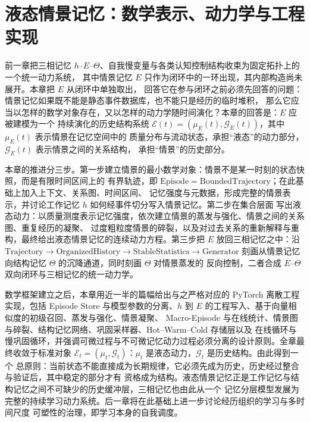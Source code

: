 \chapter{液态情景记忆：数学表示、动力学与工程实现}

\begin{chapterlead}
前一章把三相记忆 $h$--$E$--$\Theta$、自我慢变量与各类认知控制结构收束为固定拓扑上的一个统一动力系统，
其中情景记忆 $E$ 只作为闭环中的一环出现，其内部构造尚未展开。本章把 $E$ 从闭环中单独取出，
回答它在参与闭环之前必须先回答的问题：情景记忆如果既不能是静态事件数据库，也不能只是经历的临时堆积，
那么它应当以怎样的数学对象存在，又以怎样的动力学随时间演化？本章的回答是：$E$ 应被建模为一个
持续演化的历史结构系统 $\mathcal{E}(t)=(\mu_E(t),\mathcal{G}_E(t))$，其中 $\mu_E(t)$ 表示情景在记忆空间中的
质量分布与流动状态，承担“液态”的动力部分，$\mathcal{G}_E(t)$ 表示情景之间的关系结构，
承担“情景”的历史部分。

本章的推进分三步。第一步建立情景的最小数学对象：情景不是某一时刻的状态快照，而是有限时间区间上的
有界轨迹，即 $\mathrm{Episode}=\mathrm{BoundedTrajectory}$；在此基础上加入上下文、关系图、时间区间、
记忆强度与元数据，形成完整的情景表示，并讨论工作记忆 $h$ 如何经事件切分写入情景记忆。第二步在集合层面
写出液态动力：以质量测度表示记忆强度，依次建立情景的蒸发与强化、情景之间的关系图、重复经历的凝聚、
过度粗粒度情景的碎裂，以及对过去关系的重新解释与重构，最终给出液态情景记忆的连续动力方程。第三步把
$E$ 放回三相记忆之中：沿 $\mathrm{Trajectory}\to\mathrm{OrganizedHistory}\to\mathrm{StableStatistics}
\to\mathrm{Generator}$ 刻画从情景记忆向结构记忆 $\Theta$ 的沉降通道，同时刻画 $\Theta$ 对情景蒸发的
反向控制，二者合成 $E$--$\Theta$ 双向闭环与三相记忆的统一动力学。

数学框架建立之后，本章用近一半的篇幅给出与之严格对应的 PyTorch 离散工程实现，包括 Episode Store
与模型参数的分离、$h$ 到 $E$ 的工程写入、基于向量相似度的初级召回、蒸发与强化、情景凝聚、
Macro-Episode 与在线统计、情景图与碎裂、结构记忆网络、巩固采样器、Hot--Warm--Cold 存储层以及
在线循环与慢巩固循环，并强调可微过程与不可微记忆动力过程必须分离的设计原则。全章最终收敛于标准对象
$\mathcal{E}_t=(\mu_t,\mathcal{G}_t)$：$\mu_t$ 是液态动力，$\mathcal{G}_t$ 是历史结构。由此得到一个
总原则：当前状态不能直接成为长期规律，它必须先成为历史，历史经过整合与验证后，其中稳定的部分才有
资格成为结构。液态情景记忆正是工作记忆与结构记忆之间不可缺少的历史缓冲层，三相记忆也由此从一个
记忆分层模型发展为完整的持续学习动力系统。后一章将在此基础上进一步讨论经历组织的学习与多时间尺度
可塑性的治理，即学习本身的自我调度。
\end{chapterlead}

